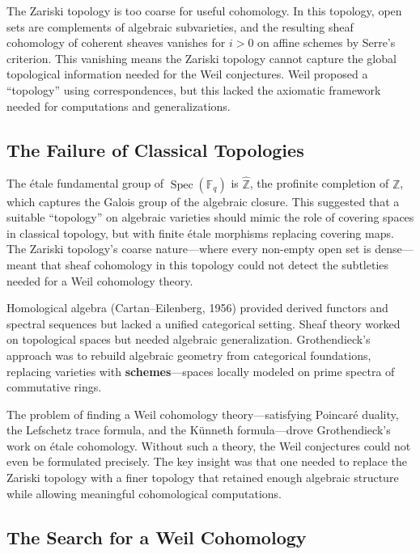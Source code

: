 The Zariski topology is too coarse for useful cohomology. In this topology, open
sets are complements of algebraic subvarieties, and the resulting sheaf
cohomology of coherent sheaves vanishes for $i > 0$ on affine schemes by
Serre's criterion. This vanishing means the Zariski topology cannot capture the
global topological information needed for the Weil conjectures. Weil proposed a
``topology'' using correspondences, but this lacked the axiomatic framework needed
for computations and generalizations.

\subsection*{The Failure of Classical Topologies}

The étale fundamental group of $\operatorname{Spec}(\mathbb{F}_q)$ is $\hat{\mathbb{Z}}$,
the profinite completion of $\mathbb{Z}$, which captures the Galois group of the
algebraic closure. This suggested that a suitable ``topology'' on algebraic
varieties should mimic the role of covering spaces in classical topology, but
with finite étale morphisms replacing covering maps. The Zariski topology's
coarse nature---where every non-empty open set is dense---meant that sheaf
cohomology in this topology could not detect the subtleties needed for a
Weil cohomology theory.

Homological algebra (Cartan--Eilenberg, 1956) provided derived functors and
spectral sequences but lacked a unified categorical setting. Sheaf theory worked
on topological spaces but needed algebraic generalization. Grothendieck's
approach was to rebuild algebraic geometry from categorical foundations,
replacing varieties with \textbf{schemes}---spaces locally modeled on prime
spectra of commutative rings.

The problem of finding a Weil cohomology theory---satisfying Poincaré duality,
the Lefschetz trace formula, and the Künneth formula---drove Grothendieck's
work on étale cohomology. Without such a theory, the Weil conjectures could not
even be formulated precisely. The key insight was that one needed to replace the
Zariski topology with a finer topology that retained enough algebraic structure
while allowing meaningful cohomological computations.

\subsection*{The Search for a Weil Cohomology}


